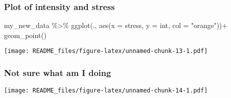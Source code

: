 \documentclass[
]{article}
\newenvironment{Shaded}{\begin{snugshade}}{\end{snugshade}}
\newcommand{\AttributeTok}[1]{\textcolor[rgb]{0.77,0.63,0.00}{#1}}
\newcommand{\FunctionTok}[1]{\textcolor[rgb]{0.00,0.00,0.00}{#1}}
\newcommand{\NormalTok}[1]{#1}
\newcommand{\SpecialCharTok}[1]{\textcolor[rgb]{0.00,0.00,0.00}{#1}}
\newcommand{\StringTok}[1]{\textcolor[rgb]{0.31,0.60,0.02}{#1}}
\begin{document}
\hypertarget{plot-of-intensity-and-stress-1}{%
\subsubsection{Plot of intensity and
stress}\label{plot-of-intensity-and-stress-1}}

\begin{Shaded}
\begin{Highlighting}[]
\NormalTok{my\_new\_data }\SpecialCharTok{\%\textgreater{}\%}
  \FunctionTok{ggplot}\NormalTok{(., }\FunctionTok{aes}\NormalTok{(}\AttributeTok{x =}\NormalTok{ stress, }\AttributeTok{y =}\NormalTok{ int, }\AttributeTok{col =} \StringTok{"orange"}\NormalTok{))}\SpecialCharTok{+}
  \FunctionTok{geom\_point}\NormalTok{()}
\end{Highlighting}
\end{Shaded}

\texttt{[image: README\_files/figure-latex/unnamed-chunk-13-1.pdf]}

\hypertarget{not-sure-what-am-i-doing}{%
\subsubsection{Not sure what am I
doing}\label{not-sure-what-am-i-doing}}

\begin{Shaded}
\end{Shaded}

\texttt{[image: README\_files/figure-latex/unnamed-chunk-14-1.pdf]}

\begin{Shaded}
\end{Shaded}
\end{document}
